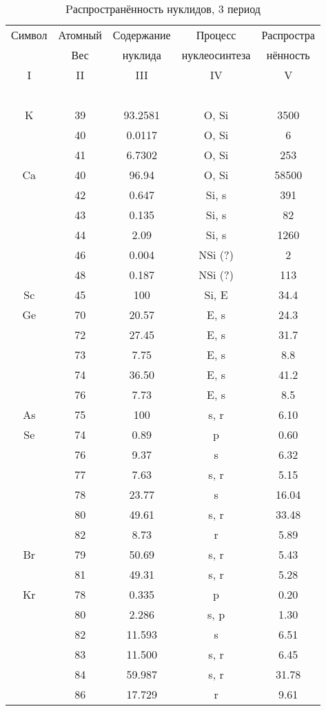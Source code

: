 \documentclass[a5paper,openany]{book}
\begin{document}
\begin{table}[h!]
	{\footnotesize 
		\begin{tabular}{ccccc}
			Символ  & Атомный &  Содержание  & Процесс & Распростра   \\
			~ & Вес &  нуклида  &  нуклеосинтеза  & нённость  \\
			\hline 
			I & II &  III  & IV & V \\
			\hline 
			~ & ~ & ~ & ~ & ~  \\
			\hline
			K & 39 & 93.2581 & O, Si &  3500 \\ [1mm]
			& 40 & 0.0117 & O, Si & 6 \\ [1mm] 			
			& 41 & 6.7302 & O, Si  & 253\\ [1mm] 	
			Ca & 40 & 96.94 & O, Si &  58500 \\ [1mm]
			& 42 & 0.647 & Si, s & 391 \\ [1mm] 			
			& 43 & 0.135 & Si, s  & 82\\ [1mm] 
			& 44 & 2.09 & Si, s & 1260 \\ [1mm] 			
			& 46 & 0.004 & NSi (?)  & 2\\ [1mm] 	
			& 48 & 0.187 & NSi (?)  & 113\\ [1mm] 	 
			Sc & 45 & 100 & Si, E  &  34.4 \\ [1mm]	
			\hline			
						Ge & 70 & 20.57 & E, s &  24.3 \\ [1mm]
			& 72 & 27.45 & E, s & 31.7 \\ [1mm] 
			& 73 & 7.75 & E, s & 8.8 \\ [1mm] 
			& 74 & 36.50 & E, s & 41.2 \\ [1mm] 
			& 76 & 7.73 & E, s & 8.5 \\ [1mm] 
			As & 75 & 100 & s, r &  6.10 \\ [1mm]
			Se & 74 & 0.89 & p & 0.60 \\ [1mm]
			& 76 & 9.37 & s & 6.32 \\ [1mm] 
			& 77 &  7.63 & s, r & 5.15 \\ [1mm]  			
			& 78 & 23.77 & s & 16.04\\ [1mm] 
			& 80 & 49.61 & s, r & 33.48 \\ [1mm]			
			& 82 & 8.73 & r & 5.89 \\ [1mm]			
			Br & 79 & 50.69 & s, r  & 5.43 \\ [1mm]
			& 81 & 49.31 & s, r  & 5.28 \\ [1mm] 
			Kr & 78 & 0.335 & p & 0.20 \\ [1mm]
			& 80 & 2.286 & s, p & 1.30 \\ [1mm] 
			& 82 &  11.593 & s & 6.51 \\ [1mm]  			
			& 83 & 11.500 & s, r & 6.45 \\ [1mm] 
			& 84 & 59.987 & s, r & 31.78 \\ [1mm]			
			& 86 & 17.729 & r & 9.61 \\ [1mm]			
			\hline 
		\end{tabular}
	}
	\caption{Pаспространённость нуклидов, 3 период}
	\label{t:AbudanceIII}
\end{table}
\end{document}

